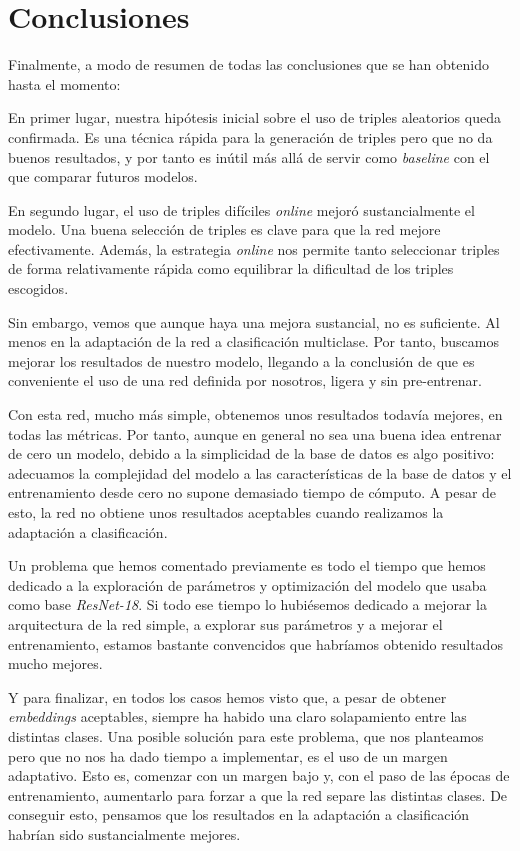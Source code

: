 \documentclass[11pt]{article}
\begin{document}
\pagebreak

\section{Conclusiones}

Finalmente, a modo de resumen de todas las conclusiones que se han obtenido hasta el momento: 

En primer lugar, nuestra hipótesis inicial sobre el uso de triples aleatorios queda confirmada. Es una técnica rápida para la generación de triples pero que no da buenos resultados, y por tanto es inútil más allá de servir como \emph{baseline} con el que comparar futuros modelos.

En segundo lugar, el uso de triples difíciles \emph{online} mejoró sustancialmente el modelo. Una buena selección de triples es clave para que la red mejore efectivamente. Además, la estrategia \emph{online} nos permite tanto seleccionar triples de forma relativamente rápida como equilibrar la dificultad de los triples escogidos. 

Sin embargo, vemos que aunque haya una mejora sustancial, no es suficiente. Al menos en la adaptación de la red a clasificación multiclase. Por tanto, buscamos mejorar los resultados de nuestro modelo, llegando a la conclusión de que es conveniente el uso de una red definida por nosotros, ligera y sin pre-entrenar.

Con esta red, mucho más simple, obtenemos unos resultados todavía mejores, en todas las métricas. Por tanto, aunque en general no sea una buena idea entrenar de cero un modelo, debido a la simplicidad de la base de datos es algo positivo: adecuamos la complejidad del modelo a las características de la base de datos y el entrenamiento desde cero no supone demasiado tiempo de cómputo. A pesar de esto, la red no obtiene unos resultados aceptables cuando realizamos la adaptación a clasificación. 

Un problema que hemos comentado previamente es todo el tiempo que hemos dedicado a la exploración de parámetros y optimización del modelo que usaba como base \emph{ResNet-18}. Si todo ese tiempo lo hubiésemos dedicado a mejorar la arquitectura de la red simple, a explorar sus parámetros y a mejorar el entrenamiento, estamos bastante convencidos que habríamos obtenido resultados mucho mejores.

Y para finalizar, en todos los casos hemos visto que, a pesar de obtener \emph{embeddings} aceptables, siempre ha habido una claro solapamiento entre las distintas clases. Una posible solución para este problema, que nos planteamos pero que no nos ha dado tiempo a implementar, es el uso de un margen adaptativo. Esto es, comenzar con un margen bajo y, con el paso de las épocas de entrenamiento, aumentarlo para forzar a que la red separe las distintas clases. De conseguir esto, pensamos que los resultados en la adaptación a clasificación habrían sido sustancialmente mejores.

\pagebreak



\end{document}
